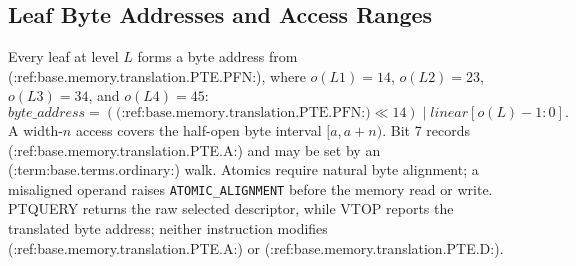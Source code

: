 \subsection{Leaf Byte Addresses and Access Ranges}
Every leaf at level $L$ forms a byte address from (:ref:base.memory.translation.PTE.PFN:), where $o(L1)=14$, $o(L2)=23$,
$o(L3)=34$, and $o(L4)=45$:
\[
\mathit{byte\_address} = (\text{(:ref:base.memory.translation.PTE.PFN:)}\ll14)\mathbin{|}\mathit{linear}[o(L)-1:0].
\]
A width-$n$ access covers the half-open byte interval $[a,a+n)$. Bit 7 records (:ref:base.memory.translation.PTE.A:) and may be set by an (:term:base.terms.ordinary:) walk.
Atomics require natural byte alignment; a misaligned operand raises \texttt{ATOMIC\_ALIGNMENT} before the memory
read or write. PTQUERY returns the raw selected descriptor, while VTOP reports the translated byte address; neither
instruction modifies (:ref:base.memory.translation.PTE.A:) or (:ref:base.memory.translation.PTE.D:).
